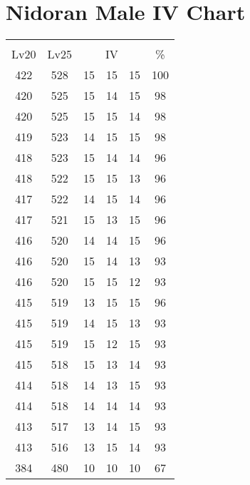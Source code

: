 \documentclass{article}%
\begin{document}
%
\normalsize%
\section{Nidoran Male IV Chart}%
\label{sec:Nidoran Male IV Chart}%
\renewcommand{\arraystretch}{1.5}%
\begin{tabular}{|c|c|c|c|c|c|}%
\hline%
\multicolumn{6}{|c|}{\textcolor{white}{ 
\linebreak{Nidoran Male}
}%
\cellcolor{black}}\\%
\multicolumn{1}{|c}{Lv20}&\multicolumn{1}{c|}{Lv25}&\multicolumn{3}{c|}{IV}&\multicolumn{1}{|c|}{\%}\\%
\hline%
\rowcolor{color100}%
422&528&15&15&15&100\\%
\hline%
\rowcolor{color98}%
420&525&15&14&15&98\\%
\hline%
\rowcolor{color98}%
420&525&15&15&14&98\\%
\hline%
\rowcolor{color98}%
419&523&14&15&15&98\\%
\hline%
\rowcolor{color96}%
418&523&15&14&14&96\\%
\hline%
\rowcolor{color96}%
418&522&15&15&13&96\\%
\hline%
\rowcolor{color96}%
417&522&14&15&14&96\\%
\hline%
\rowcolor{color96}%
417&521&15&13&15&96\\%
\hline%
\rowcolor{color96}%
416&520&14&14&15&96\\%
\hline%
\rowcolor{color93}%
416&520&15&14&13&93\\%
\hline%
\rowcolor{color93}%
416&520&15&15&12&93\\%
\hline%
\rowcolor{color96}%
415&519&13&15&15&96\\%
\hline%
\rowcolor{color93}%
415&519&14&15&13&93\\%
\hline%
\rowcolor{color93}%
415&519&15&12&15&93\\%
\hline%
\rowcolor{color93}%
415&518&15&13&14&93\\%
\hline%
\rowcolor{color93}%
414&518&14&13&15&93\\%
\hline%
\rowcolor{color93}%
414&518&14&14&14&93\\%
\hline%
\rowcolor{color93}%
413&517&13&14&15&93\\%
\hline%
\rowcolor{color93}%
413&516&13&15&14&93\\%
\hline%
\rowcolor{color91}%
384&480&10&10&10&67\\%
\end{tabular}

%
\end{document}
